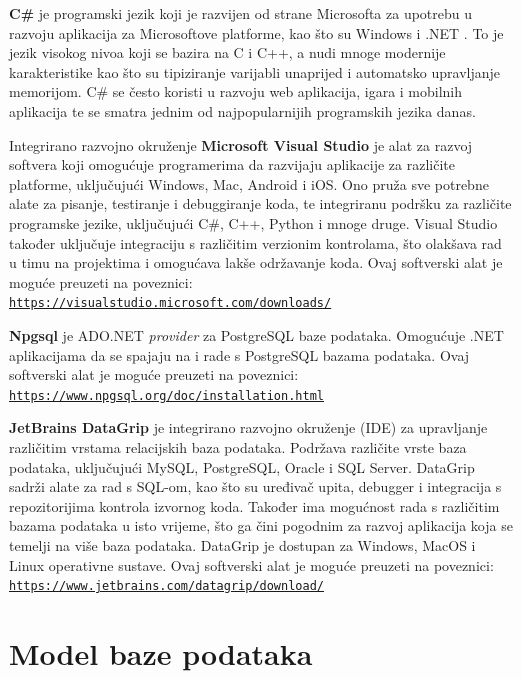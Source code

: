 \documentclass[]{foi}
\begin{document}
\textbf{C\#} je programski jezik koji je razvijen od strane Microsofta za upotrebu u razvoju aplikacija za Microsoftove platforme, kao što su Windows i .NET \cite{microsoft}. To je jezik visokog nivoa koji se bazira na C i C++, a nudi mnoge modernije karakteristike kao što su tipiziranje varijabli unaprijed i automatsko upravljanje memorijom. C\# se često koristi u razvoju web aplikacija, igara i mobilnih aplikacija te se smatra jednim od najpopularnijih programskih jezika danas.

Integrirano razvojno okruženje \textbf{Microsoft Visual Studio} \cite{microsoft} je alat za razvoj softvera koji omogućuje programerima da razvijaju aplikacije za različite platforme, uključujući Windows, Mac, Android i iOS. Ono pruža sve potrebne alate za pisanje, testiranje i debuggiranje koda, te integriranu podršku za različite programske jezike, uključujući C\#, C++, Python i mnoge druge. Visual Studio također uključuje integraciju s različitim verzionim kontrolama, što olakšava rad u timu na projektima i omogućava lakše održavanje koda. Ovaj softverski alat je moguće preuzeti na poveznici:\\ \texttt{\href{https://visualstudio.microsoft.com/downloads/}{https://visualstudio.microsoft.com/downloads/}}

\textbf{Npgsql} \cite{npgsql} je ADO.NET \textit{provider} za PostgreSQL baze podataka. Omogućuje .NET aplikacijama da se spajaju na i rade s PostgreSQL bazama podataka. Ovaj softverski alat je moguće preuzeti na poveznici:\\ \texttt{\href{https://www.npgsql.org/doc/installation.html}{https://www.npgsql.org/doc/installation.html}}

\textbf{JetBrains DataGrip} \cite{datagrip} je integrirano razvojno okruženje (IDE) za upravljanje različitim vrstama relacijskih baza podataka. Podržava različite vrste baza podataka, uključujući MySQL, PostgreSQL, Oracle i SQL Server. DataGrip sadrži alate za rad s SQL-om, kao što su uređivač upita, debugger i integracija s repozitorijima kontrola izvornog koda. Također ima mogućnost rada s različitim bazama podataka u isto vrijeme, što ga čini pogodnim za razvoj aplikacija koja se temelji na više baza podataka. DataGrip je dostupan za Windows, MacOS i Linux operativne sustave. Ovaj softverski alat je moguće preuzeti na poveznici:\\ \texttt{\href{https://www.jetbrains.com/datagrip/download/}{https://www.jetbrains.com/datagrip/download/}}

\chapter{Model baze podataka}
\end{document}
